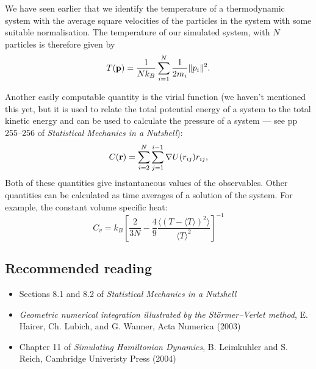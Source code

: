 We have seen earlier that we identify the temperature of a thermodynamic system with the average square velocities of the particles in the system with some suitable normalisation. The temperature of our simulated system, with $N$ particles is therefore given by
$$
	T({\bf p}) = \frac{1}{Nk_B}\sum_{i=1}^N\frac{1}{2m_i}\|p_i\|^2.
$$

Another easily computable quantity is the virial function (we haven't mentioned this yet, but it is used to relate the total potential energy of a system to the total kinetic energy and can be used to calculate the pressure of a system --- see pp 255--256 of \emph{Statistical Mechanics in a Nutshell}):
$$
	C({\bf r}) = \sum_{i=2}^N\sum_{j=1}^{i-1}\nabla U(r_{ij})r_{ij},
$$
Both of these quantities give instantaneous values of the observables. Other quantities can be calculated as time averages of a solution of the system. For example, the constant volume specific heat:
$$
	C_v = k_B\left[\frac{2}{3N}-\frac{4}{9}\frac{\langle(T-\langle T\rangle)^2\rangle}{\langle T\rangle^2}\right]^{-1}
$$

\subsection{Recommended reading}
\begin{itemize}
	\item Sections 8.1 and 8.2 of \emph{Statistical Mechanics in a Nutshell}
	\item \emph{Geometric numerical integration illustrated by the St\"{o}rmer–Verlet method}, E. Hairer, Ch. Lubich, and G. Wanner, Acta Numerica (2003)
	\item Chapter 11 of \emph{Simulating Hamiltonian Dynamics}, B. Leimkuhler and S. Reich, Cambridge Univeristy Press (2004)
\end{itemize}
